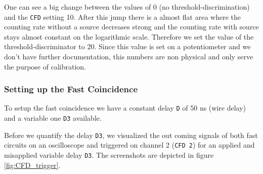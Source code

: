 \documentclass[11pt,a4paper,notitlepage]{scrartcl}
\begin{document}
One can see a big change between the values of 0 (no threshold-discrimination) and the \texttt{CFD} setting 10. After this jump there is a almost flat area where the counting rate without a source decreases strong and the counting rate with source stays almost constant on the logarithmic scale. Therefore we set the value of the threshold-discriminator to 20. Since this value is set on a potentiometer and we don't have further documentation, this numbers are non physical and only serve the purpose of calibration.

\subsubsection{Setting up the Fast Coincidence}\label{sec:fast_coincidences}
To setup the fast coincidence we have a constant delay \texttt{D} of 50 ns (wire delay) and a variable one \texttt{D3} available.

Before we quantify the delay \texttt{D3}, we visualized the out coming signals of both fast circuits on an oscilloscope and triggered on channel 2 (\texttt{CFD 2}) for an applied and misapplied variable delay \texttt{D3}. The screenshots are depicted in figure \ref{fig:CFD_trigger}.
\end{document}
